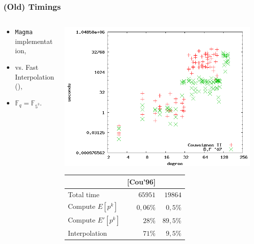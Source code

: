 \documentclass[10pt]{beamer}
\newcommand{\F}{\mathbb{F}}  %
\newcommand{\0}{\mathcal{O}}  %
\begin{document}
\begin{frame}
  \frametitle{(Old) Timings}

  \begin{columns}
    \begin{column}{0.4\textwidth}
      \begin{itemize}
      \item \texttt{Magma} implementation,
      \item \cite{Cou96} vs. Fast Interpolation (\cite{DF07}),
      \item $\F_q = \F_{5^3}$.
      \end{itemize}
    \end{column}
    \begin{column}{0.6\textwidth}
      \includegraphics[width=\textwidth]{5}

      \smallskip
      \footnotesize
      \centering
      \begin{tabular}{|l|r|r|}
        \hline
        & [Cou'96] & \cite{DF07}\\
        \hline
        
        Total time           &  $65951$ & $19864$\\
        Compute $E[p^k]$    &           $0,06$\% & $0,5$\%\\
        Compute $E'[p^k]$   &             $28$\% & $89,5$\%\\
        Interpolation &             $71$\% & $9,5$\%\\
        \hline
      \end{tabular}
    \end{column}
  \end{columns}
\end{frame}
\end{document}
